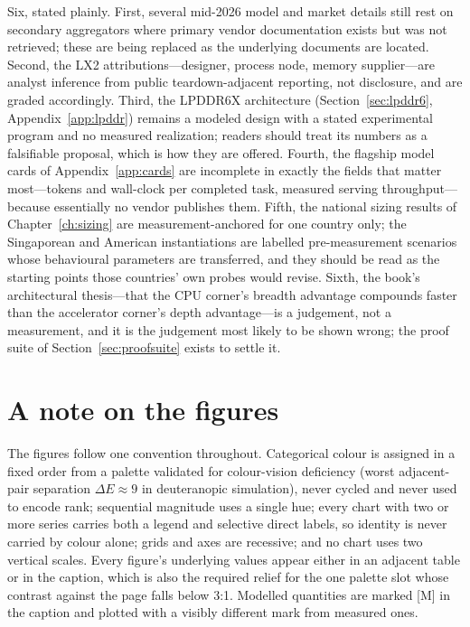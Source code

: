Six, stated plainly. First, several mid-2026 model and market details still rest on secondary aggregators where primary vendor documentation exists but was not retrieved; these are being replaced as the underlying documents are located. Second, the LX2 attributions---designer, process node, memory supplier---are analyst inference from public teardown-adjacent reporting, not disclosure, and are graded accordingly. Third, the LPDDR6X architecture (Section~\ref{sec:lpddr6}, Appendix~\ref{app:lpddr}) remains a modeled design with a stated experimental program and no measured realization; readers should treat its numbers as a falsifiable proposal, which is how they are offered. Fourth, the flagship model cards of Appendix~\ref{app:cards} are incomplete in exactly the fields that matter most---tokens and wall-clock per completed task, measured serving throughput---because essentially no vendor publishes them. Fifth, the national sizing results of Chapter~\ref{ch:sizing} are measurement-anchored for one country only; the Singaporean and American instantiations are labelled pre-measurement scenarios whose behavioural parameters are transferred, and they should be read as the starting points those countries' own probes would revise. Sixth, the book's architectural thesis---that the CPU corner's breadth advantage compounds faster than the accelerator corner's depth advantage---is a judgement, not a measurement, and it is the judgement most likely to be shown wrong; the proof suite of Section~\ref{sec:proofsuite} exists to settle it.

\section*{A note on the figures}

The figures follow one convention throughout. Categorical colour is assigned in a fixed
order from a palette validated for colour-vision deficiency (worst adjacent-pair separation $\Delta E \approx 9$ in
deuteranopic simulation), never cycled and never used to encode rank; sequential magnitude uses a single hue;
every chart with two or more series carries both a legend and selective direct labels, so identity is never
carried by colour alone; grids and axes are recessive; and no chart uses two vertical scales. Every figure's
underlying values appear either in an adjacent table or in the caption, which is also the required relief for the
one palette slot whose contrast against the page falls below 3:1. Modelled quantities are marked [M] in the
caption and plotted with a visibly different mark from measured ones.

